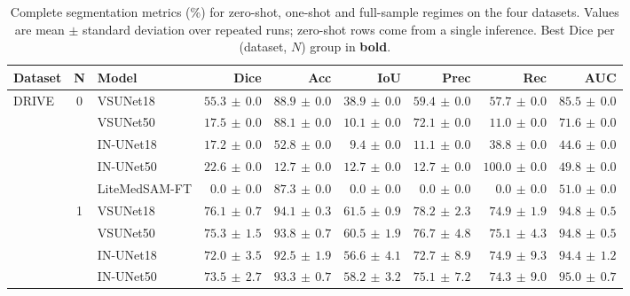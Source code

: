 \documentclass[twocolumn]{article}
\begin{document}
\begin{table}[t]
    \caption{Complete segmentation metrics (\%) for zero-shot, one-shot and full-sample regimes on the four datasets. Values are mean $\pm$ standard deviation over repeated runs; zero-shot rows come from a single inference. Best Dice per (dataset, $N$) group in \textbf{bold}.}
    \label{tab:full_metrics_appendix}
    \centering
    \begingroup
    \footnotesize
    \setlength{\tabcolsep}{3pt}
    \renewcommand{\arraystretch}{1.12}
\begin{tabular}{l c l r r r r r r}
\hline
\textbf{Dataset} & \textbf{N} & \textbf{Model} & \textbf{Dice} & \textbf{Acc} & \textbf{IoU} & \textbf{Prec} & \textbf{Rec} & \textbf{AUC} \\
\hline
\multirow{17}{*}{DRIVE} & \multirow{5}{*}{0} & VSUNet18 & $\mathbf{55.3} \,\pm\, 0.0$ & $88.9 \,\pm\, 0.0$ & $38.9 \,\pm\, 0.0$ & $59.4 \,\pm\, 0.0$ & $57.7 \,\pm\, 0.0$ & $85.5 \,\pm\, 0.0$ \\
 &  & VSUNet50 & $17.5 \,\pm\, 0.0$ & $88.1 \,\pm\, 0.0$ & $10.1 \,\pm\, 0.0$ & $72.1 \,\pm\, 0.0$ & $11.0 \,\pm\, 0.0$ & $71.6 \,\pm\, 0.0$ \\
 &  & IN-UNet18 & $17.2 \,\pm\, 0.0$ & $52.8 \,\pm\, 0.0$ & $9.4 \,\pm\, 0.0$ & $11.1 \,\pm\, 0.0$ & $38.8 \,\pm\, 0.0$ & $44.6 \,\pm\, 0.0$ \\
 &  & IN-UNet50 & $22.6 \,\pm\, 0.0$ & $12.7 \,\pm\, 0.0$ & $12.7 \,\pm\, 0.0$ & $12.7 \,\pm\, 0.0$ & $100.0 \,\pm\, 0.0$ & $49.8 \,\pm\, 0.0$ \\
 &  & LiteMedSAM-FT & $0.0 \,\pm\, 0.0$ & $87.3 \,\pm\, 0.0$ & $0.0 \,\pm\, 0.0$ & $0.0 \,\pm\, 0.0$ & $0.0 \,\pm\, 0.0$ & $51.0 \,\pm\, 0.0$ \\
\cline{2-9}
 & \multirow{7}{*}{1} & VSUNet18 & $\mathbf{76.1} \,\pm\, 0.7$ & $94.1 \,\pm\, 0.3$ & $61.5 \,\pm\, 0.9$ & $78.2 \,\pm\, 2.3$ & $74.9 \,\pm\, 1.9$ & $94.8 \,\pm\, 0.5$ \\
 &  & VSUNet50 & $75.3 \,\pm\, 1.5$ & $93.8 \,\pm\, 0.7$ & $60.5 \,\pm\, 1.9$ & $76.7 \,\pm\, 4.8$ & $75.1 \,\pm\, 4.3$ & $94.8 \,\pm\, 0.5$ \\
 &  & IN-UNet18 & $72.0 \,\pm\, 3.5$ & $92.5 \,\pm\, 1.9$ & $56.6 \,\pm\, 4.1$ & $72.7 \,\pm\, 8.9$ & $74.9 \,\pm\, 9.3$ & $94.4 \,\pm\, 1.2$ \\
 &  & IN-UNet50 & $73.5 \,\pm\, 2.7$ & $93.3 \,\pm\, 0.7$ & $58.2 \,\pm\, 3.2$ & $75.1 \,\pm\, 7.2$ & $74.3 \,\pm\, 9.0$ & $95.0 \,\pm\, 0.7$ \\

\end{tabular}
\end{table}
\end{document}
